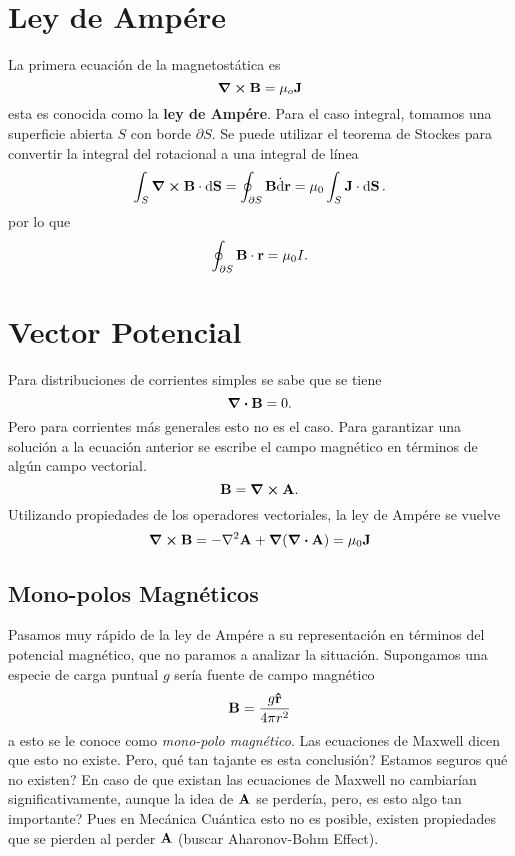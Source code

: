 \section{Ley de Ampére}
La primera ecuación de la magnetostática es
\begin{equation}
    \curl{\vb{B}} = \mu _o \vb{J}
\end{equation}
esta es conocida como la \textbf{ley de Ampére}. Para el caso integral, tomamos una superficie abierta $S$ con borde $\partial S$. Se puede utilizar el teorema de Stockes para convertir la integral del rotacional a una integral de línea
\begin{equation}
    \int _S \curl{\vb{B}} \cdot \dd{\vb{S}} = \oint _{\partial S} \vb{B} \dot \dd{\vb{r}} = \mu_0 \int _S \vb{J} \cdot \dd{\vb{S}}.
\end{equation}
por lo que
\begin{equation}
    \oint _{\partial S} \vb{B} \cdot \vb{r} = \mu_0 I.
\end{equation}

\section{Vector Potencial}
Para distribuciones de corrientes simples se sabe que se tiene
\begin{equation}
    \div{\vb{B}} = 0.
\end{equation}
Pero para corrientes más generales esto no es el caso. Para garantizar una solución a la ecuación anterior se escribe el campo magnético en términos de algún campo vectorial.
\begin{equation}
    \vb{B} = \curl{\vb{A}}.
\end{equation}
Utilizando propiedades de los operadores vectoriales, la ley de Ampére se vuelve
\begin{equation}
    \curl{\vb{B}} = -\laplacian{\vb{A}} + \grad{(\div{\vb{A}})} = \muc \vb{J}
\end{equation}

\subsection{Mono-polos Magnéticos}
Pasamos muy rápido de la ley de Ampére a su representación en términos del potencial magnético, que no paramos a analizar la situación. Supongamos una especie de carga puntual $g$ sería fuente de campo magnético
\begin{equation}
    \vb{B} = \frac{g\vu{r}}{4\pi r^2}
\end{equation}
a esto se le conoce como \textit{mono-polo magnético}. Las ecuaciones de Maxwell dicen que esto no existe. Pero, qué tan tajante es esta conclusión? Estamos seguros qué no existen? En caso de que existan las ecuaciones de Maxwell no cambiarían significativamente, aunque la idea de $\vb{A}$ se perdería, pero, es esto algo tan importante? Pues en Mecánica Cuántica esto no es posible, existen propiedades que se pierden al perder $\vb{A}$ (buscar Aharonov-Bohm Effect). \\

